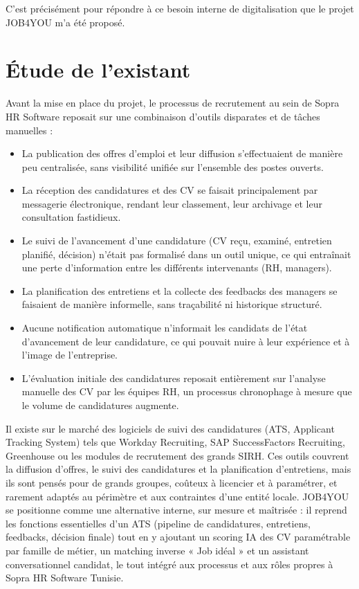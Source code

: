 C’est précisément pour répondre à ce besoin interne de digitalisation que le projet JOB4YOU m’a été proposé.

\section{Étude de l’existant}
\label{sec_1_3}
Avant la mise en place du projet, le processus de recrutement au sein de Sopra HR Software reposait sur une combinaison d’outils disparates et de tâches manuelles :

\begin{itemize}
\item La publication des offres d’emploi et leur diffusion s’effectuaient de manière peu centralisée, sans visibilité unifiée sur l’ensemble des postes ouverts.
\item La réception des candidatures et des CV se faisait principalement par messagerie électronique, rendant leur classement, leur archivage et leur consultation fastidieux.
\item Le suivi de l’avancement d’une candidature (CV reçu, examiné, entretien planifié, décision) n’était pas formalisé dans un outil unique, ce qui entraînait une perte d’information entre les différents intervenants (RH, managers).
\item La planification des entretiens et la collecte des feedbacks des managers se faisaient de manière informelle, sans traçabilité ni historique structuré.
\item Aucune notification automatique n’informait les candidats de l’état d’avancement de leur candidature, ce qui pouvait nuire à leur expérience et à l’image de l’entreprise.
\item L’évaluation initiale des candidatures reposait entièrement sur l’analyse manuelle des CV par les équipes RH, un processus chronophage à mesure que le volume de candidatures augmente.
\end{itemize}

Il existe sur le marché des logiciels de suivi des candidatures (ATS, Applicant Tracking System) tels que Workday Recruiting, SAP SuccessFactors Recruiting, Greenhouse ou les modules de recrutement des grands SIRH. Ces outils couvrent la diffusion d’offres, le suivi des candidatures et la planification d’entretiens, mais ils sont pensés pour de grands groupes, coûteux à licencier et à paramétrer, et rarement adaptés au périmètre et aux contraintes d’une entité locale. JOB4YOU se positionne comme une alternative interne, sur mesure et maîtrisée : il reprend les fonctions essentielles d’un ATS (pipeline de candidatures, entretiens, feedbacks, décision finale) tout en y ajoutant un scoring IA des CV paramétrable par famille de métier, un matching inverse « Job idéal » et un assistant conversationnel candidat, le tout intégré aux processus et aux rôles propres à Sopra HR Software Tunisie.

